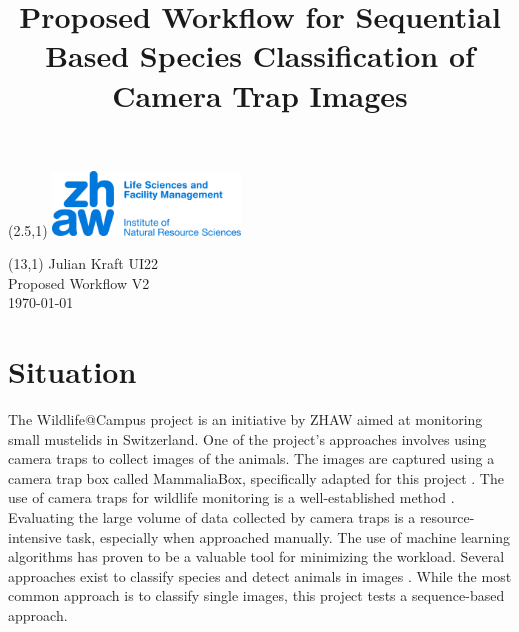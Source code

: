 \documentclass{article}
\title{Proposed Workflow for Sequential Based Species Classification of Camera Trap Images}
\makeatletter
\renewcommand{\maketitle}{
  \begin{flushleft} 
    \Large\textmd{\@title} 
    \par
  \end{flushleft}
}
\makeatother
\begin{document}
\begin{textblock}{5}(2.5,1) %
  \includegraphics[width=5cm]{resources/logo.jpg} %
\end{textblock}

\begin{textblock}{6}(13,1) %
        \raggedleft
        Julian Kraft UI22\\
        Proposed Workflow V2\\
        \today
\end{textblock}

\vspace*{1.5cm}


\maketitle

\section*{Situation} %

The Wildlife@Campus project is an initiative by ZHAW aimed at monitoring small mustelids in Switzerland.
One of the project's approaches involves using camera traps to collect images of the animals.
The images are captured using a camera trap box called MammaliaBox, specifically adapted for this
project \autocite{grafWildlifeCampusKleineSaeugetiere2022}.
The use of camera traps for wildlife monitoring is a well-established method \autocite{cordierCameraTrapResearch2022, 
beaudrotStandardizedAssessmentBiodiversity2016}.
Evaluating the large volume of data collected by camera traps
is a resource-intensive task, especially when approached manually. The use of machine learning algorithms
has proven to be a valuable tool for minimizing the workload. Several approaches exist to classify species and
detect animals in images \autocite{tabakMachineLearningClassify2019, bohnerSemiautomaticWorkflowProcess2023}.
While the most common approach is to classify single images, this project tests a sequence-based approach.
\end{document}
